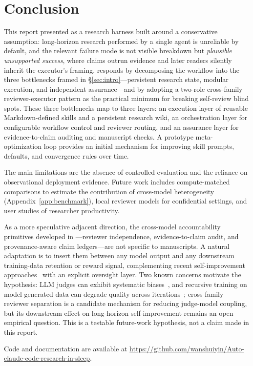 \section{Conclusion}
\label{sec:conclusion}

This report presented \aris{} as a research harness built around a conservative assumption: long-horizon research performed by a single agent is unreliable by default, and the relevant failure mode is not visible breakdown but \emph{plausible unsupported success}, where claims outrun evidence and later readers silently inherit the executor's framing.
\aris{} responds by decomposing the workflow into the three bottlenecks framed in \S\ref{sec:intro}---persistent research state, modular execution, and independent assurance---and by adopting a two-role cross-family reviewer-executor pattern as the practical minimum for breaking self-review blind spots.
These three bottlenecks map to three layers: an execution layer of reusable Markdown-defined skills and a persistent research wiki, an orchestration layer for configurable workflow control and reviewer routing, and an assurance layer for evidence-to-claim auditing and manuscript checks.
A prototype meta-optimization loop provides an initial mechanism for improving skill prompts, defaults, and convergence rules over time.

The main limitations are the absence of controlled evaluation and the reliance on observational deployment evidence.
Future work includes compute-matched comparisons to estimate the contribution of cross-model heterogeneity (Appendix~\ref{app:benchmark}), local reviewer models for confidential settings, and user studies of researcher productivity.

As a more speculative adjacent direction, the cross-model accountability primitives developed in \aris{}---reviewer independence, evidence-to-claim audit, and provenance-aware claim ledgers---are not specific to manuscripts.
A natural adaptation is to insert them between any model output and any downstream training-data retention or reward signal, complementing recent self-improvement approaches~\citep{bai2022constitutional,lee2024rlaif,yuan2024selfrewarding,yu2025rlaifv} with an explicit oversight layer.
Two known concerns motivate the hypothesis: LLM judges can exhibit systematic biases~\citep{zheng2023judging}, and recursive training on model-generated data can degrade quality across iterations~\citep{shumailov2024curse}; cross-family reviewer separation is a candidate mechanism for reducing judge-model coupling, but its downstream effect on long-horizon self-improvement remains an open empirical question.
This is a testable future-work hypothesis, not a claim made in this report.

Code and documentation are available at \url{https://github.com/wanshuiyin/Auto-claude-code-research-in-sleep}.
